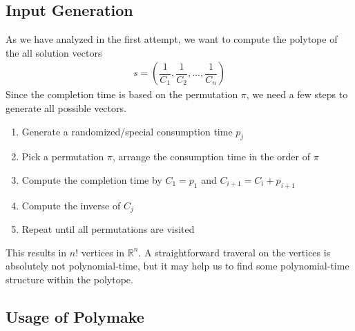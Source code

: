 \documentclass[12pt,letterpaper]{article}
\newcommand*{\R}{\mathbb{R}}
\begin{document}
\subsection{Input Generation}
As we have analyzed in the first attempt, we want to compute the polytope of the all solution vectors 
\begin{align*}
    s = (\dfrac{1}{C_1}, \dfrac{1}{C_2}, ..., \dfrac{1}{C_n})
\end{align*}
Since the completion time is based on the permutation $\pi$, we need a few steps to generate all possible 
vectors. 
\begin{enumerate}
    \item Generate a randomized/special consumption time $p_j$
    \item Pick a permutation $\pi$, arrange the consumption time in the order of $\pi$
    \item Compute the completion time by $C_1 = p_1$ and $C_{i+1} = C_i + p_{i+1}$
    \item Compute the inverse of $C_j$
    \item Repeat until all permutations are visited
\end{enumerate}
This results in $n!$ vertices in $\R^n$. A straightforward traveral on the vertices is absolutely not 
polynomial-time, but it may help us to find some polynomial-time structure within the polytope.

\subsection{Usage of Polymake}
\end{document}
